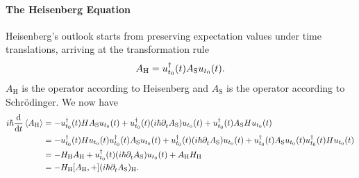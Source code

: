 \paragraph{The Heisenberg Equation}
Heisenberg's outlook starts from preserving expectation values under time translations, arriving at the transformation rule
\begin{align*}
	A_{\text{H}} = u_{t_{0}}^{\dagger}(t)A_{\text{S}}u_{t_{0}}(t).
\end{align*}
$A_{\text{H}}$ is the operator according to Heisenberg and $A_{\text{S}}$ is the operator according to Schrödinger. We now have
\begin{align*}
	i\hbar\dv{t}\expval{A_{\text{H}}} &= -\adj{u_{t_{0}}}(t)HA_{\text{S}}u_{t_{0}}(t) + \adj{u_{t_{0}}}(t)(i\hbar\del{t}{A_{\text{S}}})u_{t_{0}}(t) + \adj{u_{t_{0}}}(t)A_{\text{S}}Hu_{t_{0}}(t) \\
	                                  &= -\adj{u_{t_{0}}}(t)Hu_{t_{0}}(t)\adj{u_{t_{0}}}(t)A_{\text{S}}u_{t_{0}}(t) + \adj{u_{t_{0}}}(t)(i\hbar\del{t}{A_{\text{S}}})u_{t_{0}}(t) + \adj{u_{t_{0}}}(t)A_{\text{S}}u_{t_{0}}(t)\adj{u_{t_{0}}}(t)Hu_{t_{0}}(t) \\
	                                  &= -H_{\text{H}}A_{\text{H}} + \adj{u_{t_{0}}}(t)(i\hbar\del{t}{A_{\text{S}}})u_{t_{0}}(t) + A_{\text{H}}H_{\text{H}} \\
	                                  &= -{H_{\text{H}}}\comm{A_{\text{H}}} + (i\hbar\del{t}{A_{\text{S}}})_{\text{H}}.
\end{align*}